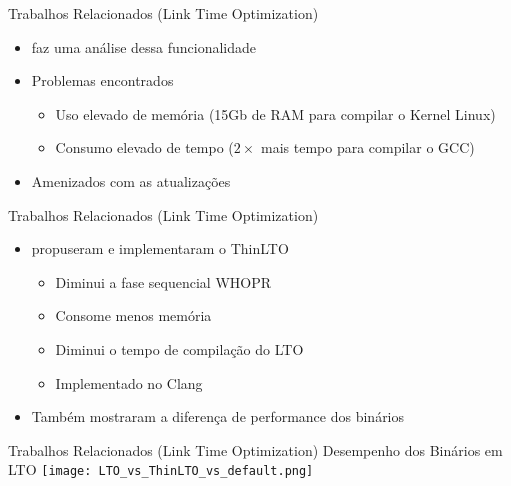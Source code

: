 \begin{frame}{Trabalhos Relacionados (Link Time Optimization)}
    \begin{itemize}
        \item \cite{livska2014optimizing} faz uma análise dessa funcionalidade
        \item Problemas encontrados
            \begin{itemize}
                \item Uso elevado de memória (15Gb de RAM para compilar o Kernel Linux)
                \item Consumo elevado de tempo ($2\times$ mais tempo para compilar o GCC)
            \end{itemize}
        \item Amenizados com as atualizações
    \end{itemize}
\end{frame}

\begin{frame}{Trabalhos Relacionados (Link Time Optimization)}
    \begin{itemize}
        \item \cite{Johnson:2017:TSI:3049832.3049845} propuseram e implementaram o ThinLTO
            \begin{itemize}
                \item Diminui a fase sequencial WHOPR
                \item Consome menos memória
                \item Diminui o tempo de compilação do LTO
                \item Implementado no Clang
            \end{itemize}
        \item Também mostraram a diferença de performance dos binários
    \end{itemize}
\end{frame}

\begin{frame}{Trabalhos Relacionados (Link Time Optimization)}
    Desempenho dos Binários em LTO \citep{Johnson:2017:TSI:3049832.3049845}
    \texttt{[image: LTO\_vs\_ThinLTO\_vs\_default.png]}
    \label{fig:performance_lto}
\end{frame}

